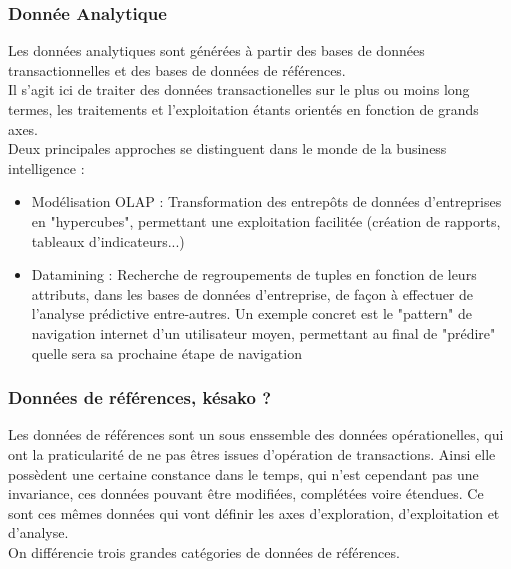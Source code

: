 \subsubsection{Donnée Analytique}

Les données analytiques sont générées à partir des bases de données transactionnelles et des bases de données de références.\\
Il s'agit ici de traiter des données transactionelles sur le plus ou moins long termes, les traitements 
et l'exploitation étants orientés en fonction de grands axes.\\
Deux principales approches se distinguent dans le monde de la business intelligence :
\begin{itemize}
\item Modélisation OLAP : Transformation des entrepôts de données d'entreprises en "hypercubes", permettant une exploitation facilitée (création de rapports, tableaux d'indicateurs...)
\item Datamining : Recherche de regroupements de tuples en fonction de leurs attributs, dans les bases de données d'entreprise, de façon à effectuer de l'analyse prédictive entre-autres. Un exemple concret est le "pattern" de navigation internet d'un utilisateur moyen, permettant au final de "prédire" quelle sera sa prochaine étape de navigation
\end{itemize}

\subsubsection{Données de références, késako ? }

Les données de références sont un sous enssemble des données opérationelles, qui ont la praticularité de ne pas êtres issues d'opération de transactions. Ainsi elle possèdent une certaine constance dans le temps, qui n'est cependant pas une invariance, ces données pouvant être modifiées, complétées voire étendues. Ce sont ces mêmes données qui vont définir les axes d'exploration, d'exploitation et d'analyse.\\
On différencie trois grandes catégories de données de références.

